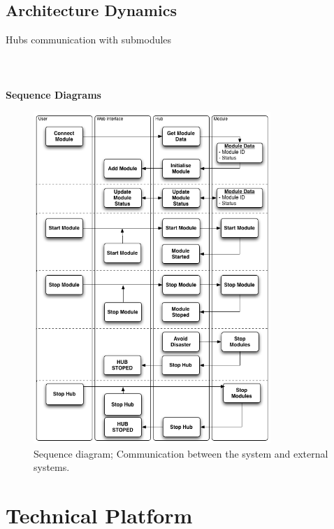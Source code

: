 \subsection{Architecture Dynamics}
Hubs communication with submodules
\\\\\\\\
\textbf{Sequence Diagrams}
\begin{figure}[H]
	\begin{centering}
		 \includegraphics[width=0.8\textwidth]{images/SequenceDiagram.png}
		\caption{Sequence diagram; Communication between the system and external systems.}
 	\end{centering}
\end{figure}	

\section{Technical Platform}
